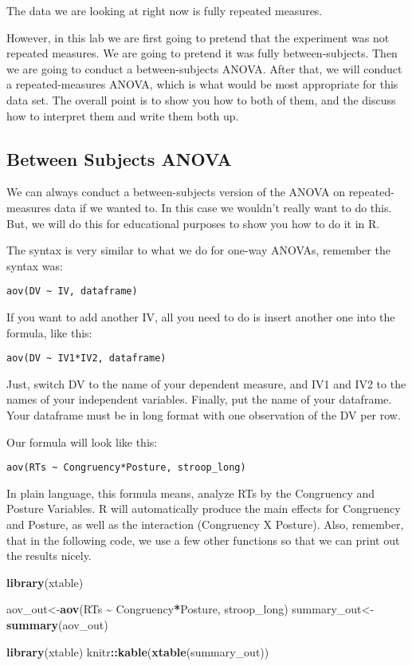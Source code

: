 \documentclass[
]{book}
\newenvironment{Shaded}{\begin{snugshade}}{\end{snugshade}}
\newcommand{\FunctionTok}[1]{\textcolor[rgb]{0.13,0.29,0.53}{\textbf{#1}}}
\newcommand{\NormalTok}[1]{#1}
\newcommand{\OtherTok}[1]{\textcolor[rgb]{0.56,0.35,0.01}{#1}}
\newcommand{\SpecialCharTok}[1]{\textcolor[rgb]{0.81,0.36,0.00}{\textbf{#1}}}
\begin{document}
The data we are looking at right now is fully repeated measures.

However, in this lab we are first going to pretend that the experiment
was not repeated measures. We are going to pretend it was fully
between-subjects. Then we are going to conduct a between-subjects ANOVA.
After that, we will conduct a repeated-measures ANOVA, which is what
would be most appropriate for this data set. The overall point is to
show you how to both of them, and the discuss how to interpret them and
write them both up.

\hypertarget{between-subjects-anova}{%
\subsection{Between Subjects ANOVA}\label{between-subjects-anova}}

We can always conduct a between-subjects version of the ANOVA on
repeated-measures data if we wanted to. In this case we wouldn't really
want to do this. But, we will do this for educational purposes to show
you how to do it in R.

The syntax is very similar to what we do for one-way ANOVAs, remember
the syntax was:

\texttt{aov(DV\ \textasciitilde{}\ IV,\ dataframe)}

If you want to add another IV, all you need to do is insert another one
into the formula, like this:

\texttt{aov(DV\ \textasciitilde{}\ IV1*IV2,\ dataframe)}

Just, switch DV to the name of your dependent measure, and IV1 and IV2
to the names of your independent variables. Finally, put the name of
your dataframe. Your dataframe must be in long format with one
observation of the DV per row.

Our formula will look like this:

\texttt{aov(RTs\ \textasciitilde{}\ Congruency*Posture,\ stroop\_long)}

In plain language, this formula means, analyze RTs by the Congruency and
Posture Variables. R will automatically produce the main effects for
Congruency and Posture, as well as the interaction (Congruency X
Posture). Also, remember, that in the following code, we use a few other
functions so that we can print out the results nicely.

\begin{Shaded}
\begin{Highlighting}[]
\FunctionTok{library}\NormalTok{(xtable)}

\NormalTok{aov\_out}\OtherTok{\textless{}{-}}\FunctionTok{aov}\NormalTok{(RTs }\SpecialCharTok{\textasciitilde{}}\NormalTok{ Congruency}\SpecialCharTok{*}\NormalTok{Posture, stroop\_long)}
\NormalTok{summary\_out}\OtherTok{\textless{}{-}}\FunctionTok{summary}\NormalTok{(aov\_out)}

\FunctionTok{library}\NormalTok{(xtable)}
\NormalTok{knitr}\SpecialCharTok{::}\FunctionTok{kable}\NormalTok{(}\FunctionTok{xtable}\NormalTok{(summary\_out))}
\end{Highlighting}
\end{Shaded}
\end{document}
